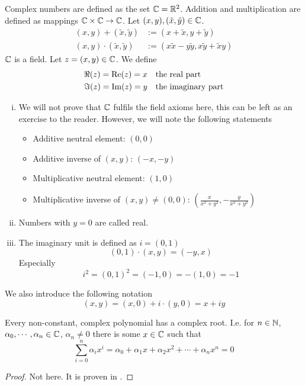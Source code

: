 \documentclass[../../script.tex]{subfiles}
\begin{document}
\begin{defi}
Complex numbers are defined as the set $\mathbb{C} = \mathbb{R}^2$. Addition and multiplication are defined as mappings $\mathbb{C} \times \mathbb{C} \rightarrow \mathbb{C}$. Let $(x, y), (\tilde{x}, \tilde{y}) \in \mathbb{C}$.
\begin{align*}
	(x, y) + (\tilde{x}, \tilde{y}) &:= (x + \tilde{x}, y + \tilde{y}) \\
	(x, y) \cdot (\tilde{x}, \tilde{y}) &:= (x\tilde{x} - y\tilde{y}, x\tilde{y} + \tilde{x}y)
\end{align*}
$\mathbb{C}$ is a field. Let $z = (x, y) \in \mathbb{C}$. We define
\begin{align*}
	\real(z) = \Re(z) = x& ~~\text{ the real part} \\
	\imag(z) = \Im(z) = y& ~~\text{ the imaginary part}
\end{align*}
\end{defi}

\begin{rem}\leavevmode
\begin{enumerate}[(i)]
	\item We will not prove that $\mathbb{C}$ fulfils the field axioms here, this can be left as an exercise to the reader. However, we will note the following statements
	\begin{itemize}
		\item Additive neutral element: $(0, 0)$
		\item Additive inverse of $(x, y)$: $(-x, -y)$
		\item Multiplicative neutral element: $(1, 0)$
		\item Multiplicative inverse of $(x, y) \ne (0, 0)$: $\left( \frac{x}{x^2 + y^2}, -\frac{y}{x^2 + y^2} \right)$
	\end{itemize}
	
	\item Numbers with $y = 0$ are called real.
	
	\item The imaginary unit is defined as $i = (0, 1)$
	\[
		(0, 1) \cdot (x, y) = (-y, x)
	\]
	Especially
	\[
		i^2 = (0, 1)^2 = (-1, 0) = -(1, 0) = -1
	\]
\end{enumerate}
We also introduce the following notation
\[
	(x, y) = (x, 0) + i\cdot(y, 0) = x + iy
\]
\end{rem}

\begin{thm}
Every non-constant, complex polynomial has a complex root. I.e. for $n \in \mathbb{N}$, $\alpha_0, \cdots, \alpha_n \in \mathbb{C}$, $\alpha_n \ne 0$ there is some $x \in \mathbb{C}$ such that
\[
	\sum_{i = 0}^n \alpha_i x^i = \alpha_0 + \alpha_1 x + \alpha_2 x^2 + \cdots + \alpha_n x^n = 0
\]
\end{thm}
\begin{proof}
Not here. It is proven in .
\end{proof}
\end{document}
